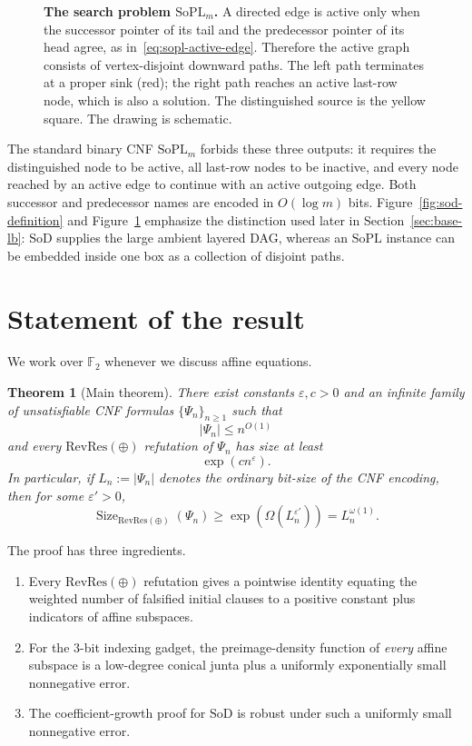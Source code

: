 \documentclass[11pt]{article}
\newtheorem{theorem}{Theorem}[section]
\theoremstyle{definition}
\newcommand{\F}{\mathbb F}
\newcommand{\RevRes}{\mathrm{RevRes}}
\newcommand{\SoPL}{\mathrm{SoPL}}
\newcommand{\SoD}{\mathrm{SoD}}
\begin{document}
\begin{figure}[htbp]
{%
}
\caption{\textbf{The search problem $\SoPL_m$.}
A directed edge is active only when the successor pointer of its tail and the
predecessor pointer of its head agree, as in~\eqref{eq:sopl-active-edge}.  Therefore
the active graph consists of vertex-disjoint downward paths.  The left path terminates
at a proper sink (red); the right path reaches an active last-row node, which is also
a solution.  The distinguished source is the yellow square.  The drawing is
schematic.}
\label{fig:sopl-definition}
\end{figure}

The standard binary CNF $\SoPL_m$ forbids these three outputs: it requires the
distinguished node to be active, all last-row nodes to be inactive, and every node
reached by an active edge to continue with an active outgoing edge.  Both successor
and predecessor names are encoded in $O(\log m)$ bits.  Figure~\ref{fig:sod-definition}
and Figure~\ref{fig:sopl-definition} emphasize the distinction used later in
Section~\ref{sec:base-lb}: $\SoD$ supplies the large ambient layered DAG, whereas an
$\SoPL$ instance can be embedded inside one box as a collection of disjoint paths.

\clearpage

\section{Statement of the result}

We work over $\F_2$ whenever we discuss affine equations.

\begin{theorem}[Main theorem]\label{thm:main}
There exist constants $\varepsilon,c>0$ and an infinite family of unsatisfiable CNF
formulas $\{\Psi_n\}_{n\ge 1}$ such that
\[
  |\Psi_n| \le n^{O(1)}
\]
and every $\RevRes(\oplus)$ refutation of $\Psi_n$ has size at least
\[
  \exp(c n^\varepsilon).
\]
In particular, if $L_n:=|\Psi_n|$ denotes the ordinary bit-size of the CNF encoding,
then for some $\varepsilon'>0$,
\[
  \operatorname{Size}_{\RevRes(\oplus)}(\Psi_n)
  \ge \exp(\Omega(L_n^{\varepsilon'}))
  = L_n^{\omega(1)}.
\]
\end{theorem}

The proof has three ingredients.

\begin{enumerate}[label=(\roman*)]
\item Every $\RevRes(\oplus)$ refutation gives a pointwise identity equating the
weighted number of falsified initial clauses to a positive constant plus indicators
of affine subspaces.
\item For the $3$-bit indexing gadget, the preimage-density function of \emph{every}
affine subspace is a low-degree conical junta plus a uniformly exponentially small
nonnegative error.
\item The coefficient-growth proof for $\SoD$ is robust under such a uniformly small
nonnegative error.
\end{enumerate}
\end{document}
